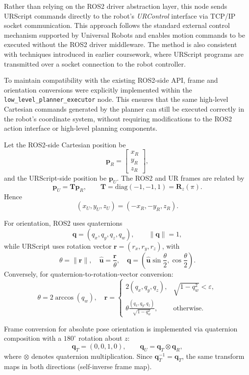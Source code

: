 \documentclass[12pt]{extarticle}
\begin{document}
Rather than relying on the ROS2 driver abstraction layer, this node sends URScript commands directly to the robot’s \textit{URControl} interface via TCP/IP socket communication. This approach follows the standard external control mechanism supported by Universal Robots and enables motion commands to be executed without the ROS2 driver middleware. The method is also consistent with techniques introduced in earlier coursework, where URScript programs are transmitted over a socket connection to the robot controller.

To maintain compatibility with the existing ROS2-side API, frame and orientation conversions were explicitly implemented within the \\\texttt{low\_level\_planner\_executor} node. This ensures that the same high-level Cartesian commands generated by the planner can still be executed correctly in the robot’s coordinate system, without requiring modifications to the ROS2 action interface or high-level planning components.

Let the ROS2-side Cartesian position be
\[
\mathbf{p}_R=\begin{bmatrix}x_R\\y_R\\z_R\end{bmatrix},
\]
and the URScript-side position be \(\mathbf{p}_U\).  
The ROS2 and UR frames are related by
\[
\mathbf{p}_U = \mathbf{T}\mathbf{p}_R,\qquad
\mathbf{T}=\mathrm{diag}(-1,-1,1)=\mathbf{R}_z(\pi).
\]
Hence
\[
(x_U,y_U,z_U)=(-x_R,-y_R,z_R).
\]

For orientation, ROS2 uses quaternions
\[
\mathbf{q}=(q_x,q_y,q_z,q_w),\qquad \|\mathbf{q}\|=1,
\]
while URScript uses rotation vector \(\mathbf{r}=(r_x,r_y,r_z)\), with
\[
\theta=\|\mathbf{r}\|,\quad \hat{\mathbf{u}}=\frac{\mathbf{r}}{\theta},\quad
\mathbf{q}=\left(\hat{\mathbf{u}}\sin\frac{\theta}{2},\cos\frac{\theta}{2}\right).
\]
Conversely, for quaternion-to-rotation-vector conversion:
\[
\theta=2\arccos(q_w),\quad
\mathbf{r}=
\begin{cases}
2(q_x,q_y,q_z), & \sqrt{1-q_w^2}<\varepsilon,\\[4pt]
\theta\frac{(q_x,q_y,q_z)}{\sqrt{1-q_w^2}}, & \text{otherwise}.
\end{cases}
\]

Frame conversion for absolute pose orientation is implemented via quaternion composition with a \(180^\circ\) rotation about \(z\):
\[
\mathbf{q}_T=(0,0,1,0),\qquad
\mathbf{q}_U=\mathbf{q}_T\otimes \mathbf{q}_R,
\]
where \(\otimes\) denotes quaternion multiplication. Since \(\mathbf{q}_T^{-1}=\mathbf{q}_T\), the same transform maps in both directions (self-inverse frame map).
\end{document}
